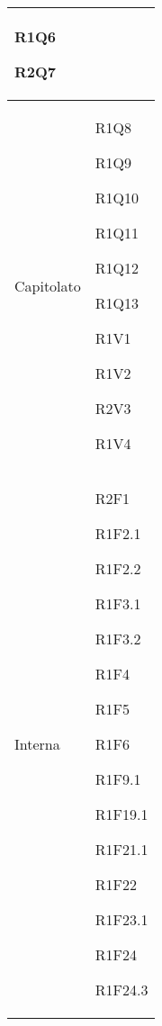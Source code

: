 \begin{center}
\begin{longtable}{|p{44mm}|p{22mm}|}
R1Q6 \newline

R2Q7 \newline
\\
\hline
Capitolato &

R1Q8 \newline

R1Q9 \newline

R1Q10 \newline

R1Q11 \newline

R1Q12 \newline

R1Q13 \newline

R1V1 \newline

R1V2 \newline

R2V3 \newline

R1V4 \newline
\\
\hline
Interna &
R2F1 \newline

R1F2.1 \newline

R1F2.2 \newline

R1F3.1 \newline

R1F3.2 \newline

R1F4 \newline

R1F5 \newline

R1F6 \newline

R1F9.1 \newline

R1F19.1 \newline

R1F21.1 \newline

R1F22 \newline

R1F23.1 \newline

R1F24 \newline

R1F24.3 \newline


\end{longtable}
\end{center}
